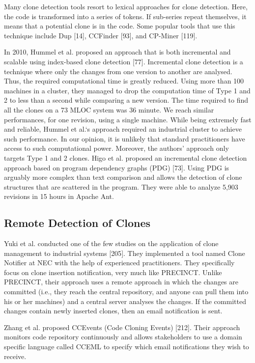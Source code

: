 \documentclass[12pt]{report}
\begin{document}
Many clone detection tools resort to lexical approaches for clone
detection. Here, the code is transformed into a series of tokens. If
sub-series repeat themselves, it means that a potential clone is in the
code. Some popular tools that use this technique include Dup {[}14{]},
CCFinder {[}93{]}, and CP-Miner {[}119{]}.

In 2010, Hummel et al. proposed an approach that is both incremental and
scalable using index-based clone detection {[}77{]}. Incremental clone
detection is a technique where only the changes from one version to
another are analysed. Thus, the required computational time is greatly
reduced. Using more than 100 machines in a cluster, they managed to drop
the computation time of Type 1 and 2 to less than a second while
comparing a new version. The time required to find all the clones on a
73 MLOC system was 36 minute. We reach similar performances, for one
revision, using a single machine. While being extremely fast and
reliable, Hummel et al.`s approach required an industrial cluster to
achieve such performance. In our opinion, it is unlikely that standard
practitioners have access to such computational power. Moreover, the
authors' approach only targets Type 1 and 2 clones. Higo et al. proposed
an incremental clone detection approach based on program dependency
graphs (PDG) {[}73{]}. Using PDG is arguably more complex than text
comparison and allows the detection of clone structures that are
scattered in the program. They were able to analyze 5,903 revisions in
15 hours in Apache Ant.

\subsection{Remote Detection of
Clones}\label{remote-detection-of-clones}

Yuki et al. conducted one of the few studies on the application of clone
management to industrial systems {[}205{]}. They implemented a tool
named Clone Notifier at NEC with the help of experienced practitioners.
They specifically focus on clone insertion notification, very much like
PRECINCT. Unlike PRECINCT, their approach uses a remote approach in
which the changes are committed (i.e., they reach the central
repository, and anyone can pull them into his or her machines) and a
central server analyses the changes. If the committed changes contain
newly inserted clones, then an email notification is sent.

Zhang et al. proposed CCEvents (Code Cloning Events) {[}212{]}. Their
approach monitors code repository continuously and allows stakeholders
to use a domain specific language called CCEML to specify which email
notifications they wish to receive.
\end{document}
